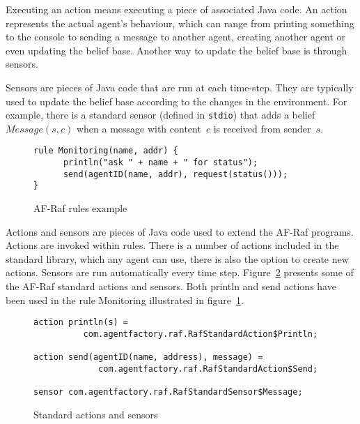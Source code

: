 \documentclass[a4paper,12pt,oneside,fleqn]{book} %
\begin{document}
Executing an action means executing a piece of associated Java code.
An action represents the actual agent's behaviour, which can
range from printing something to the console to sending a message to
another agent, creating another agent or even updating the belief base.
Another way to update the belief base is through sensors.

Sensors are pieces of Java code that are run at each time-step. They are
typically used to update the belief base according to the changes in the
environment. For example, there is a standard sensor (defined in
\texttt{stdio}) that adds a belief $\mathit{Message}(s,c)$ when a message
with content~$c$ is received from sender~$s$. 



\begin{figure}\footnotesize %
\begin{verbatim}
rule Monitoring(name, addr) {
      println("ask " + name + " for status");
      send(agentID(name, addr), request(status()));
}
\end{verbatim}
\caption{AF-Raf rules example}
\label{fig:rule}
\end{figure} %

Actions and sensors are pieces of Java code used to extend the AF-Raf
programs. Actions are invoked within rules. There is a number of actions
included in the standard library, which any agent can use, there is also
the option to create new actions. Sensors are run automatically every time
step. Figure~\ref{fig:actions-sensors} presents some of the AF-Raf standard
actions and sensors. Both println and send actions have been used in the
rule Monitoring illustrated in figure~\ref{fig:rule}.

 
\begin{figure}\footnotesize %
\begin{verbatim}
action println(s) =
          com.agentfactory.raf.RafStandardAction$Println;

action send(agentID(name, address), message) =
             com.agentfactory.raf.RafStandardAction$Send;

sensor com.agentfactory.raf.RafStandardSensor$Message;
\end{verbatim}
\caption{Standard actions and sensors}
\label{fig:actions-sensors}
\end{figure} %
\end{document}

